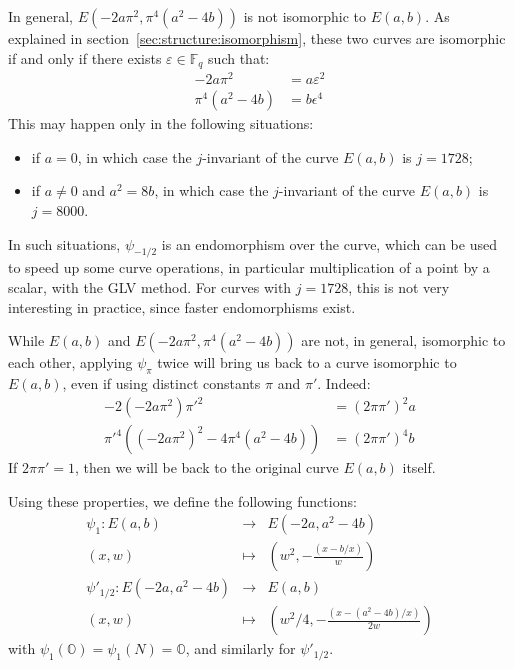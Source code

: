 \documentclass{llncs}
\newcommand{\bF}{\mathbb{F}}
\newcommand{\neutral}{\mathbb{O}}
\begin{document}
In general, $E(-2a\pi^2, \pi^4(a^2-4b))$ is not isomorphic to $E(a,b)$.
As explained in section~\ref{sec:structure:isomorphism}, these two
curves are isomorphic if and only if there exists $\varepsilon \in \bF_q$
such that:
\begin{align*}
    -2a\pi^2 &= a\varepsilon^2 \\
    \pi^4(a^2-4b) &= b\epsilon^4
\end{align*}
This may happen only in the following situations:
\begin{itemize}
    \item if $a = 0$, in which case the $j$-invariant of the curve $E(a,b)$
    is $j = 1728$;
    \item if $a\neq 0$ and $a^2 = 8b$, in which case the $j$-invariant
    of the curve $E(a,b)$ is $j = 8000$.
\end{itemize}
In such situations, $\psi_{-1/2}$ is an endomorphism over the curve,
which can be used to speed up some curve operations, in particular
multiplication of a point by a scalar, with the GLV
method\cite{GalLamVan2001}. For curves with $j = 1728$, this is not very
interesting in practice, since faster endomorphisms exist.

While $E(a,b)$ and $E(-2a\pi^2, \pi^4(a^2-4b))$ are not, in general,
isomorphic to each other, applying $\psi_\pi$ twice will bring us back
to a curve isomorphic to $E(a,b)$, even if using distinct constants
$\pi$ and $\pi'$. Indeed:
\begin{align*}
    -2(-2a\pi^2)\pi'^2 &= (2\pi\pi')^2 a \\
    \pi'^4((-2a\pi^2)^2 - 4\pi^4(a^2 - 4b)) &= (2\pi\pi')^4 b
\end{align*}
If $2\pi\pi' = 1$, then we will be back to the original curve $E(a,b)$
itself.

Using these properties, we define the following functions:
\begin{eqnarray*}
    \psi_1 : E(a, b) &\longrightarrow& E(-2a, a^2-4b) \\
    (x, w) &\longmapsto& \left(w^2, -\frac{(x - b/x)}{w}\right) \\
    \psi'_{1/2} : E(-2a, a^2-4b) &\longrightarrow& E(a, b) \\
    (x, w) &\longmapsto& \left(w^2/4, -\frac{(x - (a^2-4b)/x)}{2w}\right)
\end{eqnarray*}
with $\psi_1(\neutral) = \psi_1(N) = \neutral$, and similarly for
$\psi'_{1/2}$.
\end{document}
